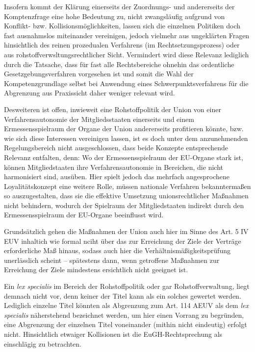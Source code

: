 \documentclass[12pt,a4paper,oneside]{book} %
\begin{document}
	Insofern kommt der Klärung einerseits der Zuordnungs- und andererseits der Komptenzfrage eine hohe Bedeutung zu, nicht zwangsläufig aufgrund von Konflikt- bzw. Kollisionsmöglichkeiten, lassen sich die einzelnen Politiken doch fast ausnahmslos miteinander vereinigen, jedoch vielmehr aus ungeklärten Fragen hinsichtlich des reinen prozedualen Verfahrens (im Rechtsetzungsprozess) oder aus rohstoffverwsltungsrechtlicher Sicht. Vermindert wird diese Relevanz lediglich durch die Tatsache, dass für fast alle Rechtsbereiche ohnehin das ordentliche Gesetzgebungsverfahren vorgesehen ist und somit die Wahl der Kompetenzgrundlage selbst bei Anwendung eines Schwerpunktsverfahrens für die Abgrenzung aus Praxissicht daher weniger relevant wird. 
	
	Desweiteren ist offen, inwieweit eine Rohstoffpolitik der Union von einer Verfahrensautonomie der Mitgliedsstaaten einerseits und einem Ermessensspielraum der Organe der Union andererseits profitieren könnte, bzw. wie sich diese Interessen vereinigen lassen, ist es doch unter dem anzunehmenden Regelungsbereich nicht ausgeschlossen, dass beide Konzepte entsprechende Relevanz entfalten, denn: Wo der Ermessensspielraum der EU-Organe stark ist, können Mitgliedstaaten ihre Verfahrensautonomie in Bereichen, die nicht harmonisiert sind, ausüben. Hier spielt jedoch das mehrfach angesprochene Loyalitätskonzept eine weitere Rolle, müssen nationale Verfahren bekanntermaßen so auszugestalten, dass sie die effektive Umsetzung unionsrechtlicher Maßnahmen nicht behindern, wodurch der Spielraum der Mitgliedstaaten indirekt durch den Ermessensspielraum der EU-Organe beeinflusst wird.
	
	Grundsätzlich gehen die Maßnahmen der Union auch hier im Sinne des Art. 5 IV EUV \glqq inhaltich wie formal nciht über das zur Erreichung der Ziele der Verträge erforderliche Maß hinaus\grqq, sodass auch hier die Verhältnismäßigkeitsprüfung unerlässlich scheint -- spätestens dann, wenn getroffene Maßnahmen zur Erreichung der Ziele mindestens ersichtlich nicht geeignet ist.\autocite{Gundel in Dause/Ludwigs, M., Rn 45 iVm u. mwN v. Danwitz EWS 2003 393ff.}
	
	Ein \textit{lex specialis} im Bereich der Rohstoffpolitik oder gar Rohstoffverwaltung, liegt demnach nicht vor, denn keiner der Titel kann als ein solches gewertet werden. Lediglich einzelne Titel könnten als Abgrenzung zum Art. 114 AEUV als dem \textit{lex specialis} näherstehend bezeichnet werden, um hier einen Vorrang zu begründen,\autocite{Calliies, Berliner Beiträge 52, S. 18ff., mwN Hamer in von der Groeben/schwarze/Hatje 2015, Art. 194, Rn. 26} eine Abgrenzung der einzelnen Titel voneinander (mithin nicht eindeutig)\autocite{Gundel EWS 2011, 25, 29; Kahl EuR 2009, 601, 608} erfolgt nicht.  Hinsichtlich etwaiger Kollisionen ist die EuGH-Rechtsprechung als einschlägig zu betrachten.
	
\end{document}
